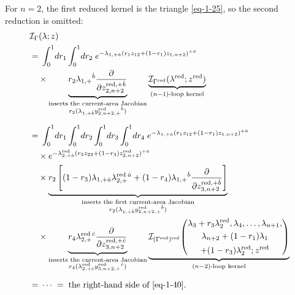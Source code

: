 \documentclass[11pt]{article}
\numberwithin{equation}{section}
\numberwithin{figure}{section}
\numberwithin{table}{section}
\begin{document}
For $n=2$, the first reduced kernel is the triangle \eqref{eq-1-25}, so the second reduction is omitted:
\begin{equation}\label{eq-fan-chain}
\begin{aligned}
&\mathcal I_\Gamma(\lambda;z)\\
&={}\int_0^1\!dr_1\int_0^1\!dr_2\;
e^{-\lambda_{1,+\dot a}(r_1z_{12}+(1-r_1)z_{1,n+2})^{+\dot a}}\\
&\quad\times
\underbrace{r_2\lambda_{1,+}{}^{\dot b}
\frac{\partial}{\partial z_{2,n+2}^{\mathrm{red},+\dot b}}}_{
\substack{\text{inserts the current-area Jacobian}\\
r_2(\lambda_{1,+\dot b}y^{\mathrm{red}}_{2,n+2,+}{}^{\dot b})}}
\underbrace{\mathcal I_{\Gamma^{\mathrm{red}}}
(\lambda^{\mathrm{red}};z^{\mathrm{red}})}_{(n-1)\text{-loop kernel}}
\\[6pt]
&={}\int_0^1\!dr_1\int_0^1\!dr_2
\int_0^1\!dr_3\int_0^1\!dr_4\;
e^{-\lambda_{1,+\dot a}(r_1z_{12}+(1-r_1)z_{1,n+2})^{+\dot a}}\\
&\quad\times
e^{-\lambda^{\mathrm{red}}_{2,+\dot a}(r_3z_{23}+(1-r_3)z^{\mathrm{red}}_{2,n+2})^{+\dot a}}\\
&\quad\times\underbrace{r_2\left[
(1-r_3)\lambda_{1,+\dot a}\lambda^{\mathrm{red}}_{2,+}{}^{\dot a}
+(1-r_4)\lambda_{1,+}{}^{\dot b}
\frac{\partial}{\partial z_{3,n+2}^{\mathrm{red},+\dot b}}
\right]}_{\substack{\text{inserts the first current-area Jacobian}\\
r_2(\lambda_{1,+\dot b}y^{\mathrm{red}}_{2,n+2,+}{}^{\dot b})}}\\
&\quad\times
\underbrace{r_4\lambda^{\mathrm{red}}_{2,+}{}^{\dot c}
\frac{\partial}{\partial z_{3,n+2}^{\mathrm{red},+\dot c}}}_{
\substack{\text{inserts the current-area Jacobian}\\
r_4(\lambda^{\mathrm{red}}_{2,+\dot c}y^{\mathrm{red}}_{3,n+2,+}{}^{\dot c})}}
\underbrace{\mathcal I_{(\Gamma^{\mathrm{red}})^{\mathrm{red}}}\!\left(
\begin{gathered}
\lambda_3+r_3\lambda_2^{\mathrm{red}},\lambda_4,\ldots,\lambda_{n+1},\\
\lambda_{n+2}+(1-r_1)\lambda_1\\
+(1-r_3)\lambda_2^{\mathrm{red}};z^{\mathrm{red}}
\end{gathered}\right)}_{(n-2)\text{-loop kernel}}
\\[6pt]
&={}\cdots\;=\;\text{the right-hand side of \eqref{eq-1-40}}.
\end{aligned}
\end{equation}
\end{document}
